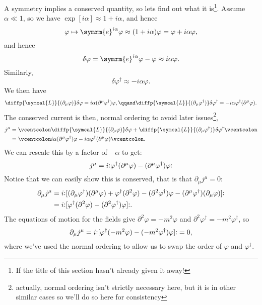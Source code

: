\documentclass[fleqn]{NotesClass}
\newcommand{\dalembertian}{\partial^2}
\newcommand{\e}{\symrm{e}}
\newcommand{\lagrangianDensity}{\symcal{L}}
\newcommand{\hermit}{{\dagger}}
\newcommand{\normalordering}[1]{\mathopen{\vcentcolon}{#1}\mathclose{\vcentcolon}}
\begin{document}
    A symmetry implies a conserved quantity, so lets find out what it is\footnote{If the title of this section hasn't already given it away!}.
    Assume \(\alpha \ll 1\), so we have \(\exp[i\alpha] \approx 1 + i\alpha\), and hence
    \begin{equation}
        \varphi \mapsto \e^{i\alpha}\varphi \approx (1 + i\alpha)\varphi = \varphi + i\alpha \varphi,
    \end{equation}
    and hence
    \begin{equation}
        \delta \varphi = \e^{i\alpha}\varphi - \varphi \approx i\alpha\varphi.
    \end{equation}
    Similarly,
    \begin{equation}
        \delta \varphi^\hermit \approx -i\alpha\varphi.
    \end{equation}
    We then have
    \begin{equation}
        \diffp{\lagrangianDensity}{(\partial_\mu\varphi)} \delta \varphi = i\alpha(\partial^\mu\varphi^\hermit)\varphi, \qqand \diffp{\lagrangianDensity}{(\partial_\mu\varphi^\hermit)}\delta\varphi^\hermit = -i\alpha\varphi^\hermit(\partial^\mu\varphi).
    \end{equation}
    The conserved current is then, normal ordering to avoid later issues\footnote{actually, normal ordering isn't strictly necessary here, but it is in other similar cases so we'll do so here for consistency},
    \begin{align}
        j^\mu &= \normalordering{\diffp{\lagrangianDensity}{(\partial_\mu\varphi)}\delta\varphi + \diffp{\lagrangianDensity}{(\partial_\mu\varphi^\hermit)}\delta\varphi^\hermit}\\
        &= \normalordering{i\alpha(\partial^\mu\varphi^\hermit)\varphi - i\alpha\varphi^\hermit(\partial^\mu\varphi)}.
    \end{align}
    We can rescale this by a factor of \(-\alpha\) to get:
    \begin{equation}
        j^\mu = i\normalordering{\varphi^\hermit (\partial^\mu\varphi) - (\partial^\mu\varphi^\hermit)\varphi}
    \end{equation}
    Notice that we can easily show this is conserved, that is that \(\partial_\mu j^\mu = 0\):
    \begin{align}
        \partial_\mu j^\mu &= i\normalordering{[(\partial_\mu\varphi^\hermit)(\partial^\mu\varphi) + \varphi^\hermit(\dalembertian\varphi) - (\dalembertian\varphi^\hermit)\varphi - (\partial^\mu\varphi^\hermit)(\partial_\mu\varphi)]}\\
        &= i\normalordering{[\varphi^\hermit(\dalembertian\varphi) - (\dalembertian\varphi^\hermit)\varphi]}.
    \end{align}
    The equations of motion for the fields give \(\dalembertian\varphi = -m^2\varphi\) and \(\dalembertian\varphi^\hermit = -m^2\varphi^\hermit\), so
    \begin{equation}
        \partial_\mu j^\mu = i\normalordering{[\varphi^\hermit(-m^2\varphi) - (-m^2\varphi^\hermit)\varphi]} = 0,
    \end{equation}
    where we've used the normal ordering to allow us to swap the order of \(\varphi\) and \(\varphi^\hermit\).
    
\end{document}
